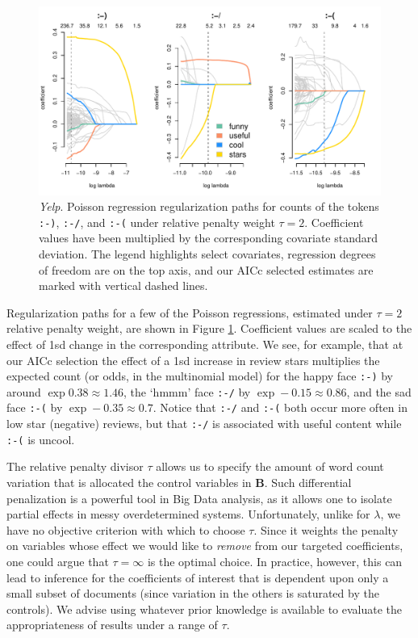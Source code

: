 \documentclass[12pt]{article}
\newcommand{\bm}[1]{\mathbf{#1}}
\newcommand{\cd}[1]{{\tt#1}}
\begin{document}
\begin{figure}[b!]
\hspace{-.25in}\includegraphics[width=6.75in]{yelp_ir_paths}
\caption{\label{yelp_ir} {\it Yelp}.  
Poisson regression regularization paths for counts of the tokens \cd{:-)},
\cd{:-/}, and
\cd{:-(} under relative penalty weight $\tau=2$.  Coefficient values have been
multiplied by the corresponding covariate standard deviation.  The legend
highlights select covariates, regression degrees of freedom are on the top
axis, and our AICc selected estimates are marked with vertical dashed lines. }
\end{figure}


Regularization paths for a few of the Poisson regressions, estimated under
$\tau=2$ relative penalty weight, are shown in Figure \ref{yelp_ir}.
Coefficient values are scaled to the effect of 1sd change in
the corresponding attribute. We see, for example, that at our AICc selection
the effect of a 1sd increase in review stars multiplies the expected count (or
odds, in the multinomial model) for the happy face
  \cd{:\!-\!)} by around $\exp 0.38 \approx 1.46$, the `hmmm' face \cd{:\!-\!/} by $\exp
  -0.15 \approx 0.86$, and the sad face \cd{:\!-\!(} by $\exp -0.35 \approx 0.7$.
 Notice that \cd{:\!-\!/} and \cd{:\!-\!(} both occur more often in low star
 (negative) reviews, but that \cd{:\!-\!/} is associated with useful content while
 \cd{:\!-\!(} is uncool.


The relative penalty divisor $\tau$ allows us to specify the amount of word
count variation that is allocated the control variables in $\bm{B}$. Such
differential penalization is a powerful tool in Big Data analysis,  as it
allows one to isolate partial effects in messy overdetermined systems.
Unfortunately, unlike for $\lambda$, we have no objective criterion with which to
choose $\tau$.  Since it weights the penalty on variables whose effect we
would like to {\it remove} from our targeted coefficients, one could argue that
$\tau = \infty$ is the optimal choice. In practice, however, this can lead to
inference for the coefficients of interest that is dependent upon only a small
subset of documents (since variation in the others is saturated by the
controls).  We advise using whatever  prior knowledge is available to
evaluate the appropriateness of results under a range of $\tau$.
\end{document}
